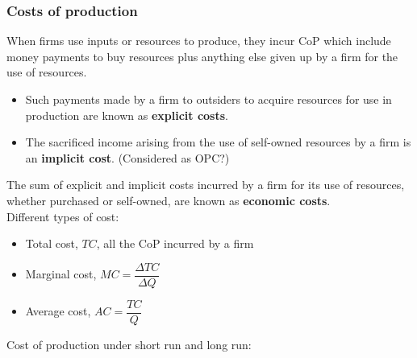 \documentclass[a4paper,12pt]{article}
\newcommand{\needbold}[1]{\textcolor{red!70!black}{\textbf{#1}}}
\begin{document}
\subsubsection*{Costs of production}
When firms use inputs or resources to produce, they incur CoP which include money payments
to buy resources plus anything else given up by a firm for the use of resources.
\begin{itemize}
  \item Such payments made by a firm to outsiders to acquire resources for use in production are known as \needbold{explicit costs}.
  \item The sacrificed income arising from the use of self-owned resources by a firm is an \needbold{implicit cost}. (Considered as OPC?)
\end{itemize}
The sum of explicit and implicit costs incurred by a firm for its use of resources, whether purchased or self-owned, are known as \needbold{economic costs}.\\
Different types of cost: 
\begin{itemize}
  \item Total cost, $TC$, all the CoP incurred by a firm
  \item Marginal cost, $MC=\dfrac{\Delta TC}{\Delta Q}$
  \item Average cost, $AC=\dfrac{TC}{Q}$
\end{itemize}
Cost of production under short run and long run:
\end{document}
